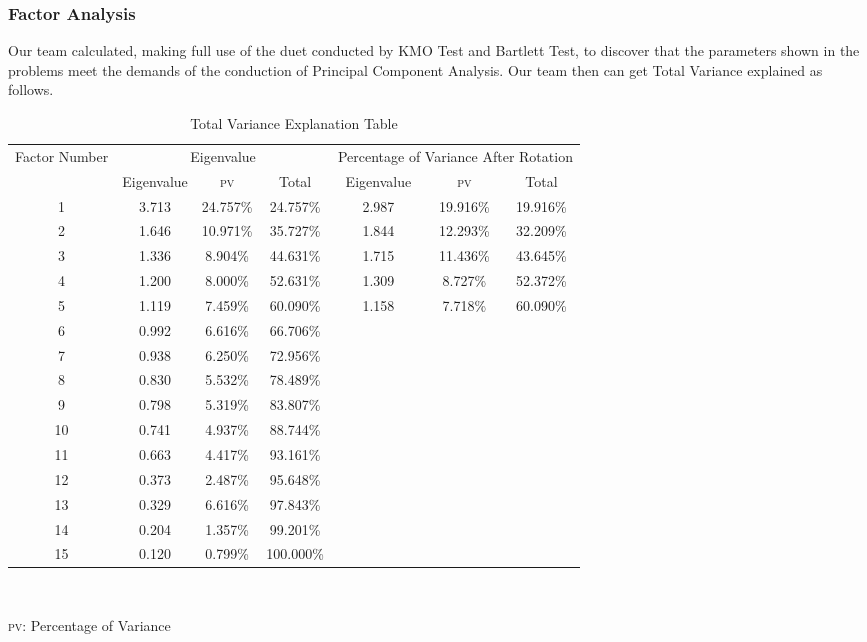 \documentclass[12pt]{article}
\begin{document}
{\subsubsection{Factor Analysis}
Our team calculated, making full use of the duet conducted by KMO Test and Bartlett Test, to discover that the parameters shown in the problems meet the demands of the conduction of Principal Component Analysis. Our team then can get Total Variance explained as follows.\\
\begin{table}[htbp]
{\centering
	\begin{tabular}{|c|c|c|c|c|c|c|}
		\hline
		\multirow{2}{*}{Factor Number} & \multicolumn{3}{c|}{Eigenvalue} &\multicolumn{3}{c|}{Percentage of Variance After Rotation}\\
		\cline{2-7}
		&Eigenvalue &{\textsc{pv}} &Total & Eigenvalue &{\textsc{pv}} & Total\\
		\hline
		1 &3.713 &24.757\% &24.757\% &2.987 &19.916\% &19.916\%\\
		\hline
		2 &1.646 &10.971\% &35.727\% &1.844 &12.293\% &32.209\%\\
		\hline
		3 &1.336 &8.904\% &44.631\% &1.715 &11.436\% &43.645\%\\
		\hline
		4 &1.200 &8.000\% &52.631\% &1.309 &8.727\% &52.372\%\\
		\hline
		5 &1.119 &7.459\% &60.090\% &1.158 &7.718\% &60.090\%\\
		\hline
		6 &0.992 &6.616\% &66.706\%\\
		\cline{1-4}
		7 &0.938 &6.250\% &72.956\%\\
		\cline{1-4}
		8 &0.830 &5.532\% &78.489\%\\
		\cline{1-4}
		9 &0.798 &5.319\% &83.807\%\\
		\cline{1-4}
 		10 &0.741 &4.937\% &88.744\%\\
		\cline{1-4}
		11 &0.663 &4.417\% &93.161\%\\
		\cline{1-4}
		12 &0.373 &2.487\% &95.648\%\\
		\cline{1-4}
		13 &0.329 &6.616\% &97.843\%\\
		\cline{1-4}
		14 &0.204 &1.357\% &99.201\%\\
		\cline{1-4}
		15 &0.120 &0.799\% &100.000\% \\
		\cline{1-4}
		\end{tabular}\\
}
{\textsc{pv}}: Percentage of Variance
\caption{Total Variance Explanation Table}
\end{table}
}
\end{document}
